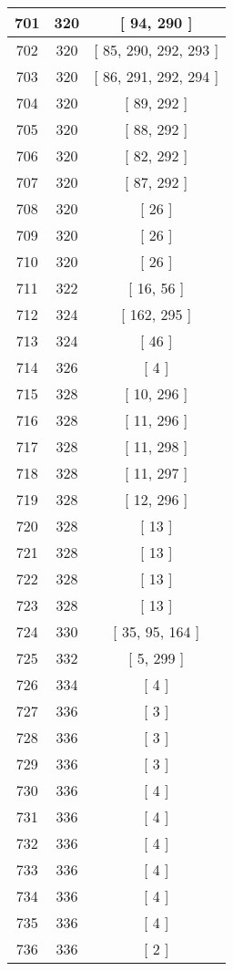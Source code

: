 \begin{center}
\begin{longtable}[H]{|| c c c ||}
\hline
701 & 320 & [ 94, 290 ] \\ 
\hline
702 & 320 & [ 85, 290, 292, 293 ] \\ 
\hline
703 & 320 & [ 86, 291, 292, 294 ] \\ 
\hline
704 & 320 & [ 89, 292 ] \\ 
\hline
705 & 320 & [ 88, 292 ] \\ 
\hline
706 & 320 & [ 82, 292 ] \\ 
\hline
707 & 320 & [ 87, 292 ] \\ 
\hline
708 & 320 & [ 26 ] \\ 
\hline
709 & 320 & [ 26 ] \\ 
\hline
710 & 320 & [ 26 ] \\ 
\hline
711 & 322 & [ 16, 56 ] \\ 
\hline
712 & 324 & [ 162, 295 ] \\ 
\hline
713 & 324 & [ 46 ] \\ 
\hline
714 & 326 & [ 4 ] \\ 
\hline
715 & 328 & [ 10, 296 ] \\ 
\hline
716 & 328 & [ 11, 296 ] \\ 
\hline
717 & 328 & [ 11, 298 ] \\ 
\hline
718 & 328 & [ 11, 297 ] \\ 
\hline
719 & 328 & [ 12, 296 ] \\ 
\hline
720 & 328 & [ 13 ] \\ 
\hline
721 & 328 & [ 13 ] \\ 
\hline
722 & 328 & [ 13 ] \\ 
\hline
723 & 328 & [ 13 ] \\ 
\hline
724 & 330 & [ 35, 95, 164 ] \\ 
\hline
725 & 332 & [ 5, 299 ] \\ 
\hline
726 & 334 & [ 4 ] \\ 
\hline
727 & 336 & [ 3 ] \\ 
\hline
728 & 336 & [ 3 ] \\ 
\hline
729 & 336 & [ 3 ] \\ 
\hline
730 & 336 & [ 4 ] \\ 
\hline
731 & 336 & [ 4 ] \\ 
\hline
732 & 336 & [ 4 ] \\ 
\hline
733 & 336 & [ 4 ] \\ 
\hline
734 & 336 & [ 4 ] \\ 
\hline
735 & 336 & [ 4 ] \\ 
\hline
736 & 336 & [ 2 ] \\ 

\end{longtable}
\end{center}
